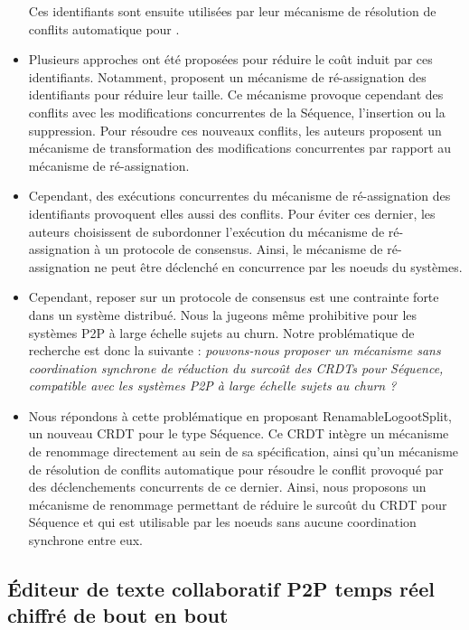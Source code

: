 \begin{itemize}
        Ces identifiants sont ensuite utilisées par leur mécanisme de résolution de conflits automatique pour .
    \item Plusieurs approches ont été proposées pour réduire le coût induit par ces identifiants.
        Notamment, \cite{letia:hal-01248270,zawirski:hal-01248197} proposent un mécanisme de ré-assignation des identifiants pour réduire leur taille.
        Ce mécanisme provoque cependant des conflits avec les modifications concurrentes de la Séquence, \ie l'insertion ou la suppression.
        Pour résoudre ces nouveaux conflits, les auteurs proposent un mécanisme de transformation des modifications concurrentes par rapport au mécanisme de ré-assignation.
    \item Cependant, des exécutions concurrentes du mécanisme de ré-assignation des identifiants provoquent elles aussi des conflits.
        Pour éviter ces dernier, les auteurs choisissent de subordonner l'exécution du mécanisme de ré-assignation à un protocole de consensus.
        Ainsi, le mécanisme de ré-assignation ne peut être déclenché en concurrence par les noeuds du systèmes.
    \item Cependant, reposer sur un protocole de consensus est une contrainte forte dans un système distribué.
        Nous la jugeons même prohibitive pour les systèmes \ac{P2P} à large échelle sujets au churn.
        Notre problématique de recherche est donc la suivante : \emph{pouvons-nous proposer un mécanisme sans coordination synchrone de réduction du surcoût des \acp{CRDT} pour Séquence, \ie compatible avec les systèmes \ac{P2P} à large échelle sujets au churn ?}
    \item Nous répondons à cette problématique en proposant RenamableLogootSplit, un nouveau \ac{CRDT} pour le type Séquence.
        Ce \ac{CRDT} intègre un mécanisme de renommage directement au sein de sa spécification, ainsi qu'un mécanisme de résolution de conflits automatique pour résoudre le conflit provoqué par des déclenchements concurrents de ce dernier.
        Ainsi, nous proposons un mécanisme de renommage permettant de réduire le surcoût du \ac{CRDT} pour Séquence et qui est utilisable par les noeuds sans aucune coordination synchrone entre eux.
\end{itemize}

\subsection{Éditeur de texte collaboratif \ac{P2P} temps réel chiffré de bout en bout}

